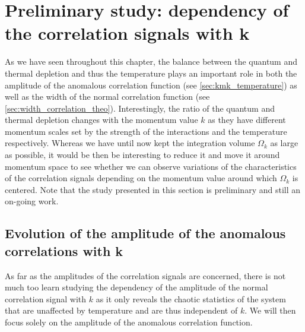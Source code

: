 

\section{Preliminary study: dependency of the correlation signals with k}

As we have seen throughout this chapter, the balance between the quantum and thermal depletion and thus the temperature plays an important role in both the amplitude of the anomalous correlation function (see \ref{sec:kmk_temperature}) as well as the width of the normal correlation function (see \ref{sec:width_correlation_theo}). Interestingly, the ratio of the quantum and thermal depletion changes with the momentum value $k$ as they have different momentum scales set by the strength of the interactions and the temperature respectively. Whereas we have until now kept the integration volume $\Omega_k$ as large as possible, it would be then be interesting to reduce it and move it around momentum space to see whether we can observe variations of the characteristics of the correlation signals depending on the momentum value around which $\Omega_k$ is centered. Note that the study presented in this section is preliminary and still an on-going work.

\subsection{Evolution of the amplitude of the anomalous correlations with k}

As far as the amplitudes of the correlation signals are concerned, there is not much too learn studying the dependency of the amplitude of the normal correlation signal with $k$ as it only reveals the chaotic statistics of the system that are unaffected by temperature and are thus independent of $k$. We will then focus solely on the amplitude of the anomalous correlation function. 

